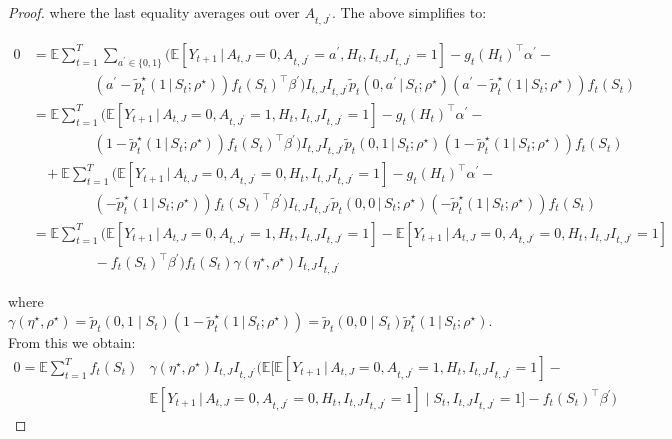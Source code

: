 \documentclass[12pt]{article}
\def\E{\mathbb{E}}
\def\given{\, | \,}
\begin{document}
\begin{proof}
where the last equality averages out over $A_{t,J^\prime}$. The above simplifies to:

\begin{align*}
    0 &= \E \sum_{t=1}^T \sum_{a^\prime \in \{0,1\}} \Big(\E \left[Y_{t+1} \given{A_{t,J}=0,A_{t,J^\prime}=a^\prime, H_t ,I_{t,J}I_{t,J^\prime}=1} \right]- g_t(H_t)^\top\alpha^\prime- \nonumber \\
    &  ~~~~~~~~~~~~~~~~~~~~  (a^\prime - \tilde p_t^\star (1 \given S_t;\rho^\star) ) f_t (S_t)^\top \beta^\prime \Big) I_{t,J}I_{t,J^\prime}\tilde p_t (0,a^\prime \given S_t;\rho^\star)(a^\prime - \tilde {p}^\star_t (1 \given S_t;\rho^\star) ) f_t (S_t) \nonumber \\
    &= \E \sum_{t=1}^T  \Big(\E \left[Y_{t+1} \given{A_{t,J}=0,A_{t,J^\prime}=1, H_t ,I_{t,J}I_{t,J^\prime}=1} \right]- g_t(H_t)^\top\alpha^\prime- \nonumber \\
    &  ~~~~~~~~~~~~~~~~~~~~  (1 - \tilde p_t^\star (1 \given S_t;\rho^\star) ) f_t (S_t)^\top \beta^\prime \Big) I_{t,J}I_{t,J^\prime}\tilde p_t (0,1 \given S_t;\rho^\star)(1 - \tilde {p}^\star_t (1 \given S_t;\rho^\star) ) f_t (S_t) \nonumber \\
    & ~~~~ +\E \sum_{t=1}^T \Big(\E \left[Y_{t+1} \given{A_{t,J}=0,A_{t,J^\prime}=0, H_t ,I_{t,J}I_{t,J^\prime}=1} \right]- g_t(H_t)^\top\alpha^\prime- \nonumber \\
    &  ~~~~~~~~~~~~~~~~~~~~  ( - \tilde p_t^\star (1 \given S_t;\rho^\star) ) f_t (S_t)^\top \beta^\prime \Big) I_{t,J}I_{t,J^\prime}\tilde p_t (0,0 \given S_t;\rho^\star)( - \tilde {p}^\star_t (1 \given S_t;\rho^\star) ) f_t (S_t) \nonumber \\
    &= \E \sum_{t=1}^T \Big(\E \left[Y_{t+1} \given{A_{t,J}=0,A_{t,J^\prime}=1, H_t ,I_{t,J}I_{t,J^\prime}=1} \right] - \E \left[Y_{t+1} \given{A_{t,J}=0,A_{t,J^\prime}=0, H_t ,I_{t,J}I_{t,J^\prime}=1} \right]\nonumber \\
    &  ~~~~~~~~~~~~~~~~~~~~  -f_t (S_t)^\top \beta^\prime \Big)  f_t (S_t) \gamma(\eta^\star,\rho^\star) I_{t,J}I_{t,J^\prime}
\end{align*}

where $\gamma(\eta^\star,\rho^\star) = \tilde{p}_t (0,1 \mid S_t)(1- \tilde {p}^\star_t (1 \given S_t;\rho^\star)) = \tilde{p}_t (0,0 \mid S_t) \tilde {p}^\star_t (1 \given S_t;\rho^\star) $. From this we obtain:
\begin{align*}
   0 = \E \sum_{t=1}^T  f_t (S_t) &\gamma(\eta^\star,\rho^\star) I_{t,J}I_{t,J^\prime}   \Big(\E \Big[\E \left[Y_{t+1} \given{A_{t,J}=0,A_{t,J^\prime}=1, H_t ,I_{t,J}I_{t,J^\prime}=1} \right] - \nonumber \\
   &\E \left[Y_{t+1} \given{A_{t,J}=0,A_{t,J^\prime}=0, H_t ,I_{t,J}I_{t,J^\prime}=1} \right] \mid S_t,I_{t,J}I_{t,J^\prime}=1\Big]  -f_t (S_t)^\top \beta^\prime \Big)
\end{align*}


\end{proof}
\end{document}
